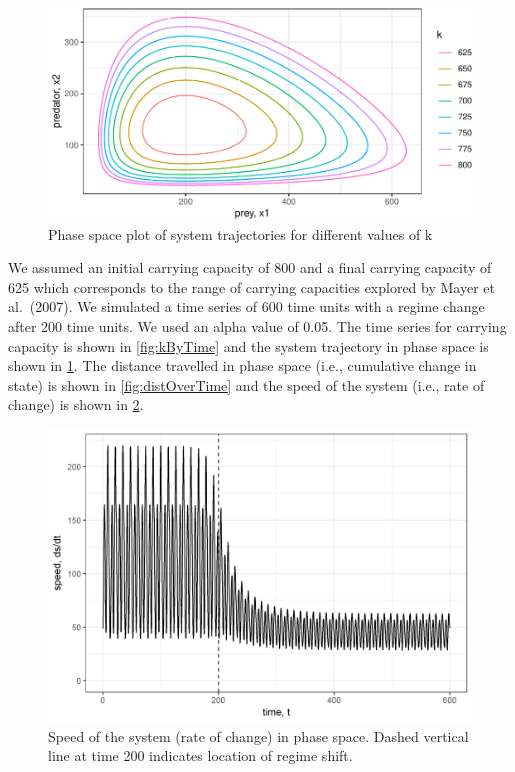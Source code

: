 \documentclass[12pt,twoside,openany]{reedthesis}
\begin{document}
\begin{figure}

{\centering \includegraphics[width=0.85\linewidth]{_myDissertation_files/figure-latex/kTrajectories-1} 

}

\caption{Phase space plot of system trajectories for different values of k}\label{fig:kTrajectories}
\end{figure}
We assumed an initial carrying capacity of 800 and a final carrying capacity of 625 which corresponds to the range of carrying capacities explored by Mayer et al.~(2007). We simulated a time series of 600 time units with a regime change after 200 time units. We used an alpha value of 0.05. The time series for carrying capacity is shown in \ref{fig:kByTime} and the system trajectory in phase space is shown in \ref{fig:kTrajectories}. The distance travelled in phase space (i.e., cumulative change in state) is shown in \ref{fig:distOverTime} and the speed of the system (i.e., rate of change) is shown in \ref{fig:dsdtOverTime}.
\begin{figure}

{\centering \includegraphics[width=0.85\linewidth]{./chapterFiles/fiGuide/figures/dsdtOverTime} 

}

\caption{Speed of the system (rate of change) in phase space. Dashed vertical line at time 200 indicates location of regime shift.}\label{fig:dsdtOverTime}
\end{figure}
\end{document}
